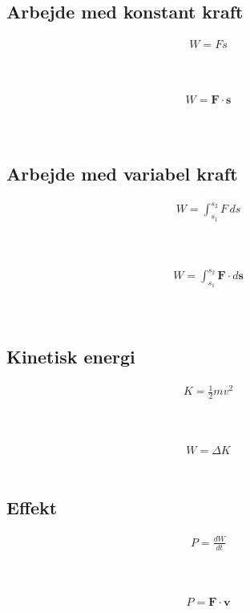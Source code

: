 \subsection{Arbejde med konstant kraft}
	\begin{align}
		W=Fs
	\end{align}
	\arbejde\\
	\kraft\\
	\strek

	\begin{align}
		W=\mathbf{F}\cdot\mathbf{s}
	\end{align}
	\arbejde\\
	\Kraft\\
	\Strek

\subsection{Arbejde med variabel kraft}
	\begin{align}
		W=\int_{s_1}^{s_2}F\,ds
	\end{align}
	\arbejde\\
	\kraft\\
	\strek

	\begin{align}
		W=\int_{s_1}^{s_2}\mathbf{F}\cdot d\mathbf{s}
	\end{align}
	\arbejde\\
	\Kraft\\
	\Strek

\subsection{Kinetisk energi}
	\begin{align}
		K=\frac{1}{2}mv^2
	\end{align}
	\kinenergi\\
	\masse\\
	\vel

	\begin{align}
		W=\Delta K
	\end{align}
	\arbejde\\
	\kinenergi

\subsection{Effekt}
	\begin{align}
		P=\frac{dW}{dt}
	\end{align}
	\effekt\\
	\arbejde\\
	\tid

	\begin{align}
		P=\mathbf{F}\cdot\mathbf{v}
	\end{align}
	\effekt\\
	\Kraft\\
	\Vel
